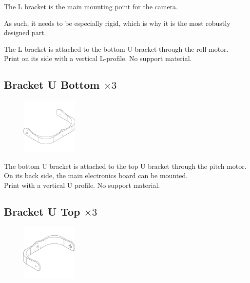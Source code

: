 The L bracket is the main mounting point for the camera. 

As such, it needs to be especially rigid, which is why it is the most robustly designed part. 

The L bracket is attached to the bottom U bracket through the roll motor.\\

\raisebox{-0.2cm}{\hspace{-1.5cm}\Huge\Info}\normalsize \quad Print on its side with a vertical L-profile. No support material.


\subsection{Bracket U Bottom $\times3$}

\begin{figure}
    \vspace{-1.5cm}
    \includegraphics[width=0.25\textwidth]{PrintedParts/bracket_U_top.PNG}
\end{figure}

The bottom U bracket is attached to the top U bracket through the pitch motor. On its back side, the main electronics board can be mounted.\\

\raisebox{-0.2cm}{\hspace{-1.5cm}\Huge\Info}\normalsize \quad Print with a vertical U profile. No support material.


\subsection{Bracket U Top $\times3$}

\begin{figure}
    \vspace{-3cm}
    \includegraphics[width=0.25\textwidth]{PrintedParts/bracket_U_bottom.PNG}
\end{figure}

